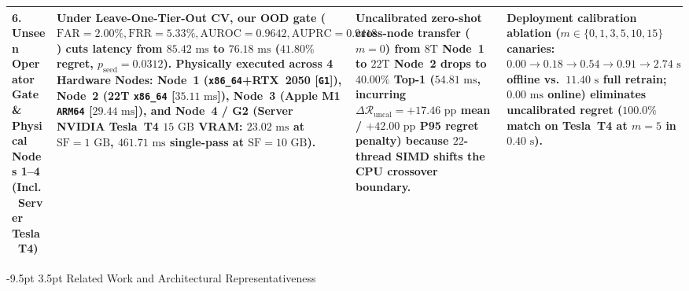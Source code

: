 \documentclass[10pt,a4paper]{article}
\makeatletter
\newenvironment{fitasttable}{%
  \begin{lrbox}{\asttblbox}%
}{%
  \end{lrbox}%
  \sbox{\asttblboxB}{%
    \ifdim\wd\asttblbox>0.96\textwidth
      \resizebox{0.96\textwidth}{!}{\usebox{\asttblbox}}%
    \else
      \usebox{\asttblbox}%
    \fi
  }%
  \ifdim\ht\asttblboxB>0.72\textheight
    \resizebox{!}{0.72\textheight}{\usebox{\asttblboxB}}%
  \else
    \usebox{\asttblboxB}%
  \fi
}
\renewcommand\section{\@startsection{section}{1}{\z@}%
  {-9.5pt \@plus -2pt \@minus -1.5pt}%
  {3.5pt \@plus 1pt}%
  {\normalfont\large\bfseries}}
\makeatother
\begin{document}
\begin{table}[!htbp]
{\begin{fitasttable}
\begin{tabular}{@{}p{2.6cm}p{4.6cm}p{4.3cm}p{4.5cm}@{}}
\textbf{6. Unseen Operator Gate \& Physical Nodes 1--4 (Incl.\ Server Tesla~T4)} & Under Leave-One-Tier-Out CV, our OOD gate ($\text{FAR}=2.00\%, \text{FRR}=5.33\%, \text{AUROC}=0.9642, \text{AUPRC}=0.9418$) cuts latency from $85.42\text{ ms}$ to $76.18\text{ ms}$ ($41.80\%$ regret, $p_{\text{seed}}=0.0312$). Physically executed across \textbf{4 Hardware Nodes}: Node~1 (\texttt{x86\_64}+RTX~2050 [\texttt{G1}]), Node~2 (22T \texttt{x86\_64} [$35.11\text{ ms}$]), Node~3 (Apple M1 \texttt{ARM64} [$29.44\text{ ms}$]), and \textbf{Node~4 / G2 (Server NVIDIA Tesla~T4 $15\text{ GB}$ VRAM: $23.02\text{ ms}$ at $\text{SF}=1\text{ GB}$, $461.71\text{ ms}$ single-pass at $\text{SF}=10\text{ GB}$)}. & Uncalibrated zero-shot cross-node transfer ($m=0$) from $8\text{T}$ Node~1 to $22\text{T}$ Node~2 drops to $40.00\%$ Top-1 ($54.81\text{ ms}$, incurring $\Delta\mathcal{R}_{\text{uncal}}=+17.46\text{ pp}$ mean / $+42.00\text{ pp}$ P95 regret penalty) because $22$-thread SIMD shifts the CPU crossover boundary. & Deployment calibration ablation ($m\in\{0,1,3,5,10,15\}$ canaries: $0.00\rightarrow 0.18\rightarrow 0.54\rightarrow 0.91\rightarrow 2.74\text{ s}$ offline vs.\ $11.40\text{ s}$ full retrain; $0.00\text{ ms}$ online) eliminates uncalibrated regret ($100.0\%$ match on Tesla~T4 at $m=5$ in $0.40\text{ s}$). \\
\bottomrule
\end{tabular}
\end{fitasttable}
}
\end{table}

\section{Related Work and Architectural Representativeness}
\end{document}
